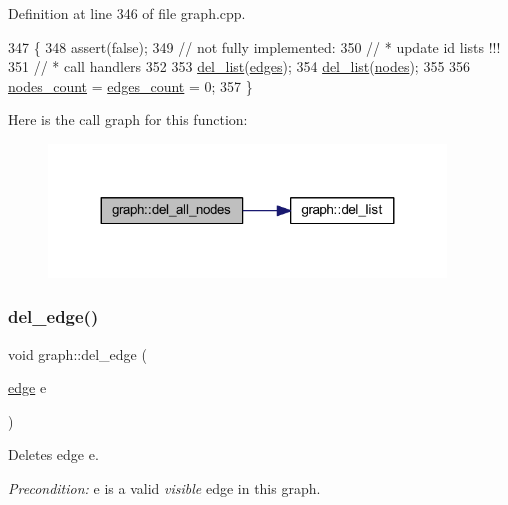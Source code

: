 Definition at line 346 of file graph.\+cpp.


\begin{DoxyCode}
347 \{
348     assert(\textcolor{keyword}{false});
349     \textcolor{comment}{// not fully implemented:}
350     \textcolor{comment}{//  * update id lists !!!}
351     \textcolor{comment}{//  * call handlers}
352 
353     \mbox{\hyperlink{classgraph_a23f0a5fb311b7d71bb9dfc4e8aedef35}{del\_list}}(\mbox{\hyperlink{classgraph_ab5b1c610cca1bcf72b05aacc28a48153}{edges}});
354     \mbox{\hyperlink{classgraph_a23f0a5fb311b7d71bb9dfc4e8aedef35}{del\_list}}(\mbox{\hyperlink{classgraph_a4ea0592e8eb7c26c5abad24546907726}{nodes}});
355 
356     \mbox{\hyperlink{classgraph_a1f59223d0bcf647920963d7a661dd74a}{nodes\_count}} = \mbox{\hyperlink{classgraph_af560ff4263ad165c166a46084e781b4a}{edges\_count}} = 0;
357 \}
\end{DoxyCode}
Here is the call graph for this function\+:
\nopagebreak
\begin{figure}[H]
\begin{center}
\leavevmode
\includegraphics[width=299pt]{classgraph_ad0ca1578643a51f96a76a846f14558df_cgraph}
\end{center}
\end{figure}
\mbox{\label{classgraph_ad9356508c49c542dfd4b7169297387c6}} 
\subsubsection{\texorpdfstring{del\+\_\+edge()}{del\_edge()}}
{\footnotesize\ttfamily void graph\+::del\+\_\+edge (\begin{DoxyParamCaption}\item[{\mbox{\hyperlink{classedge}{edge}}}]{e }\end{DoxyParamCaption})}

Deletes edge {\ttfamily e}.

{\itshape Precondition\+:} {\ttfamily e} is a valid {\itshape visible} edge in this graph.


